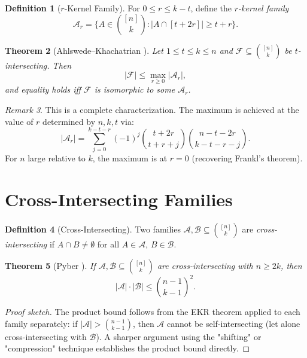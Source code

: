 \documentclass[12pt,a4paper]{amsart}
\newtheorem{theorem}{Theorem}[section]
\theoremstyle{definition}
\newtheorem{definition}[theorem]{Definition}
\theoremstyle{remark}
\newtheorem{remark}[theorem]{Remark}
\begin{document}
\begin{definition}[$r$-Kernel Family]
For $0 \leq r \leq k-t$, define the \emph{$r$-kernel family}
\[
  \mathcal{A}_r = \{A \in \binom{[n]}{k} : |A \cap [t+2r]| \geq t+r\}.
\]
\end{definition}

\begin{theorem}[Ahlswede--Khachatrian \cite{AhlswedeKhachatrian1997}]\label{thm:ak}
Let $1 \leq t \leq k \leq n$ and $\mathcal{F} \subseteq \binom{[n]}{k}$ be
$t$-intersecting. Then
\[
  |\mathcal{F}| \leq \max_{r \geq 0} |\mathcal{A}_r|,
\]
and equality holds iff $\mathcal{F}$ is isomorphic to some $\mathcal{A}_r$.
\end{theorem}

\begin{remark}
This is a complete characterization. The maximum is achieved at the value of $r$
determined by $n, k, t$ via:
\[
  |\mathcal{A}_r| = \sum_{j=0}^{k-t-r} (-1)^j \binom{t+2r}{t+r+j}\binom{n-t-2r}{k-t-r-j}.
\]
For $n$ large relative to $k$, the maximum is at $r=0$ (recovering Frankl's theorem).
\end{remark}

\section{Cross-Intersecting Families}\label{sec:cross}

\begin{definition}[Cross-Intersecting]
Two families $\mathcal{A}, \mathcal{B} \subseteq \binom{[n]}{k}$ are
\emph{cross-intersecting} if $A \cap B \neq \emptyset$ for all $A \in \mathcal{A}$,
$B \in \mathcal{B}$.
\end{definition}

\begin{theorem}[Pyber \cite{Pyber1986}]\label{thm:pyber}
If $\mathcal{A}, \mathcal{B} \subseteq \binom{[n]}{k}$ are cross-intersecting with
$n \geq 2k$, then
\[
  |\mathcal{A}| \cdot |\mathcal{B}| \leq \binom{n-1}{k-1}^2.
\]
\end{theorem}

\begin{proof}[Proof sketch]
The product bound follows from the EKR theorem applied to each family separately:
if $|\mathcal{A}| > \binom{n-1}{k-1}$, then $\mathcal{A}$ cannot be self-intersecting
(let alone cross-intersecting with $\mathcal{B}$).
A sharper argument using the "shifting" or "compression" technique establishes the
product bound directly.
\end{proof}
\end{document}
